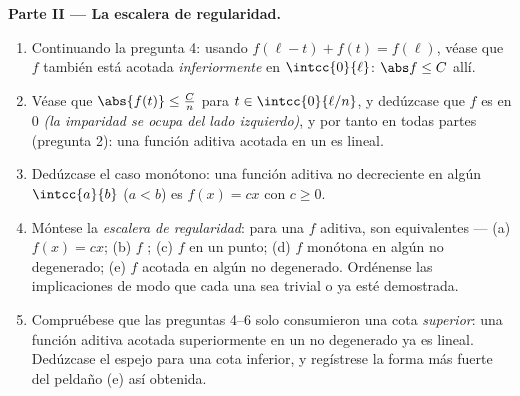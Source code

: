 \begin{problem}[{Problema del fin de semana --- $f(x + y) = f(x) + f(y)$:
la regularidad fuerza la linealidad, y el retrato de los monstruos}]
\medskip
\noindent\textbf{Parte II --- La escalera de regularidad.}
\begin{enumerate}[resume]
  \item Continuando la pregunta 4: usando
        $f(\ell - t) + f(t) = f(\ell)$, véase que $f$ también está
        acotada \emph{inferiormente} en $\intcc{0}{\ell}$:
        $\abs f \leq C$ allí.
  \item Véase que $\abs{f(t)} \leq \frac{C}{n}$ para
        $t \in \intcc{0}{\ell/n}$, y dedúzcase que $f$ es 
        en $0$ \emph{(la imparidad se ocupa del lado izquierdo)}, y
        por tanto en todas partes (pregunta 2): una función aditiva
        acotada en un  es lineal.
  \item Dedúzcase el caso monótono: una función aditiva no
        decreciente en algún $\intcc{a}{b}$ ($a < b$) es $f(x) = cx$
        con $c \geq 0$.
  \item Móntese la \emph{escalera de regularidad}: para una $f$
        aditiva, son equivalentes --- (a) $f(x) = cx$; (b) $f$
        ; (c) $f$  en un punto; (d) $f$ monótona
        en algún  no degenerado; (e) $f$ acotada en algún
         no degenerado. Ordénense las implicaciones de modo
        que cada una sea trivial o ya esté demostrada.
  \item Compruébese que las preguntas 4--6 solo consumieron una cota
        \emph{superior}: una función aditiva acotada superiormente en
        un  no degenerado ya es lineal. Dedúzcase el
         espejo para una cota inferior, y regístrese la
        forma más fuerte del peldaño (e) así obtenida.
\end{enumerate}


\end{problem}
